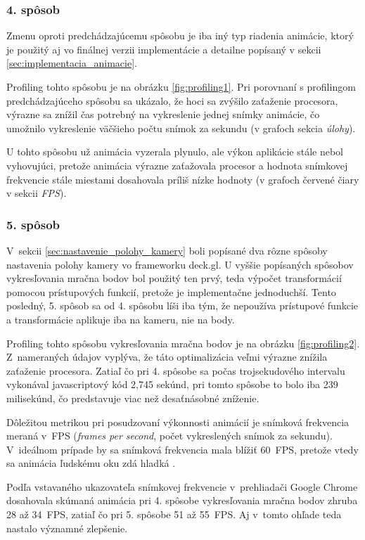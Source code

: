 \subsubsection{4. spôsob}

Zmenu oproti predchádzajúcemu spôsobu je iba iný typ riadenia animácie, ktorý je použitý aj vo finálnej verzii implementácie a detailne popísaný v sekcii \ref{sec:implementacia_animacie}.

Profiling tohto spôsobu je na obrázku \ref{fig:profiling1}. Pri porovnaní s profilingom predchádzajúceho spôsobu sa ukázalo, že hoci sa zvýšilo zaťaženie procesora, výrazne sa znížil čas potrebný na vykreslenie jednej snímky animácie, čo umožnilo vykreslenie väčšieho počtu snímok za sekundu (v grafoch sekcia \emph{úlohy}).

U tohto spôsobu už animácia vyzerala plynulo, ale výkon aplikácie stále nebol vyhovujúci, pretože animácia výrazne zaťažovala procesor a hodnota snímkovej frekvencie stále miestami dosahovala príliš nízke hodnoty (v grafoch červené čiary v sekcii \emph{FPS}).

\subsubsection{5. spôsob}

V~sekcii \ref{sec:nastavenie_polohy_kamery} boli popísané dva rôzne spôsoby nastavenia polohy kamery vo frameworku deck.gl. U vyššie popísaných spôsobov vykresľovania mračna bodov bol použitý ten prvý, teda výpočet transformácií pomocou prístupových funkcií, pretože je implementačne jednoduchší. Tento posledný, 5. spôsob sa od 4. spôsobu líši iba tým, že nepoužíva prístupové funkcie a transformácie aplikuje iba na kameru, nie na body. 

Profiling tohto spôsobu vykresľovania mračna bodov je na obrázku \ref{fig:profiling2}. Z~nameraných údajov vyplýva, že táto optimalizácia veľmi výrazne znížila zaťaženie procesora. Zatiaľ čo pri 4. spôsobe sa počas trojsekudového intervalu vykonával javascriptový kód 2,745 sekúnd, pri tomto spôsobe to bolo iba 239 milisekúnd, čo predstavuje viac než desaťnásobné zníženie.

Dôležitou metrikou pri posudzovaní výkonnosti animácií je snímková frekvencia meraná v~FPS (\emph{frames per second}, počet vykreslených snímok za sekundu). V~ideálnom prípade by sa snímková frekvencia mala blížiť 60~FPS, pretože vtedy sa animácia ľudskému oku zdá hladká \cite{chrome_profiling}.

Podľa vstavaného ukazovateľa snímkovej frekvencie v~prehliadači Google Chrome dosahovala skúmaná animácia pri 4. spôsobe vykresľovania mračna bodov zhruba 28 až 34~FPS, zatiaľ čo pri 5. spôsobe 51 až 55~FPS. Aj v~tomto ohľade teda nastalo významné zlepšenie.


